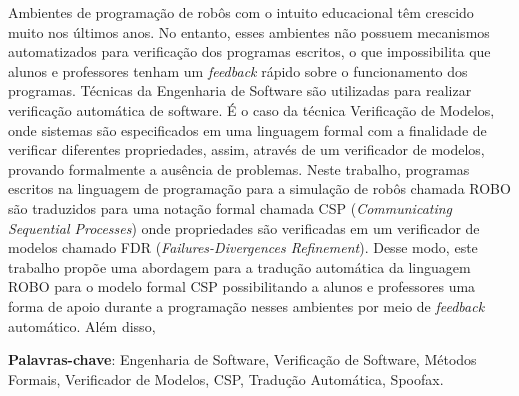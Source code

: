 \setlength{\absparsep}{18pt} %
\begin{resumo}
 
Ambientes de programação de robôs com o intuito educacional têm crescido muito nos últimos anos. No entanto, esses ambientes não possuem mecanismos automatizados para verificação dos programas escritos, o que impossibilita que alunos e professores tenham um \textit{feedback} rápido sobre o funcionamento dos programas. Técnicas da Engenharia de Software são utilizadas para realizar verificação automática de software. É o caso da técnica Verificação de Modelos, onde sistemas são especificados em uma linguagem formal com a finalidade de verificar diferentes propriedades, assim, através de um verificador de modelos, provando formalmente a ausência de problemas. 
Neste trabalho, programas escritos na linguagem de programação para a simulação de robôs chamada ROBO são traduzidos para uma notação formal chamada CSP (\textit{Communicating Sequential Processes}) onde propriedades são verificadas em um verificador de modelos chamado FDR (\textit{Failures-Divergences Refinement}). Desse modo, este trabalho propõe uma abordagem para a tradução automática da linguagem ROBO para o modelo formal CSP possibilitando a alunos e professores uma forma de apoio durante a programação nesses ambientes por meio de \textit{feedback} automático. Além disso, 

 \textbf{Palavras-chave}: Engenharia de Software, Verificação de Software, Métodos Formais, Verificador de Modelos, CSP, Tradução Automática, Spoofax.
\end{resumo}

